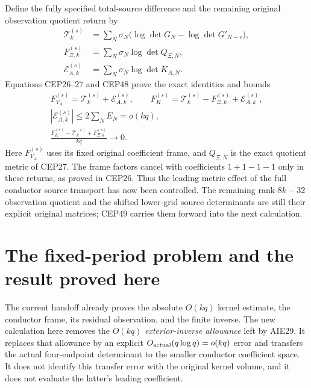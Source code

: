 \documentclass[11pt,a4paper]{article}
\begin{document}
Define the fully specified total-source difference and the
remaining original observation quotient return by
\[
 \begin{split}
 \mathcal T_k^{(s)}
   &=\sum_N\sigma_N
          \bigl(\log\det G_N-\log\det G'_{N-v}\bigr),\\
 F_{\Xi,k}^{(s)}&=\sum_N\sigma_N\log\det Q_{\Xi,N},\\
 \mathcal E_{A,k}^{(s)}
   &=\sum_N\sigma_N\log\det K_{A,N}.
 \end{split}
\]
Equations CEP26--27 and CEP48 prove the exact identities and bounds
\[
 \begin{gathered}
 F_{V_A}^{(s)}
      =\mathcal T_k^{(s)}+\mathcal E_{A,k}^{(s)},\qquad
 F_K^{(s)}
      =\mathcal T_k^{(s)}-F_{\Xi,k}^{(s)}
                              +\mathcal E_{A,k}^{(s)},\\
 |\mathcal E_{A,k}^{(s)}|\le2\sum_N E_N=o(kq),\\
 \frac{F_K^{(s)}-\mathcal T_k^{(s)}+F_{\Xi,k}^{(s)}}{kq}
        \longrightarrow0 .
 \end{gathered}\tag{CEP49}
\]
Here $F_{V_A}^{(s)}$ uses its fixed original coefficient frame,
and $Q_{\Xi,N}$ is the exact quotient metric of CEP27.
The frame factors cancel with coefficients $1+1-1-1$ only in
these returns, as proved in CEP26. Thus the leading metric
effect of the full conductor source transport has now been
controlled. The remaining rank-$8k-32$ observation quotient
and the shifted lower-grid source determinants are still their
explicit original matrices; CEP49 carries them forward into
the next calculation.



\clearpage
\section{The fixed-period problem and the result proved here}
\label{sec:FEX-scope}
The current handoff already proves the absolute $O(kq)$ kernel estimate,
the conductor frame, its residual observation, and the finite inverse.
The new calculation here removes the $O(kq)$ \emph{exterior-inverse
allowance} left by AIE29. It replaces that allowance by an explicit
$O_{\rm actual}(q\log q)=o(kq)$ error and transfers the actual
four-endpoint determinant to the smaller conductor coefficient space.
It does not identify this transfer error with the original kernel
volume, and it does not evaluate the latter's leading coefficient.
\end{document}
